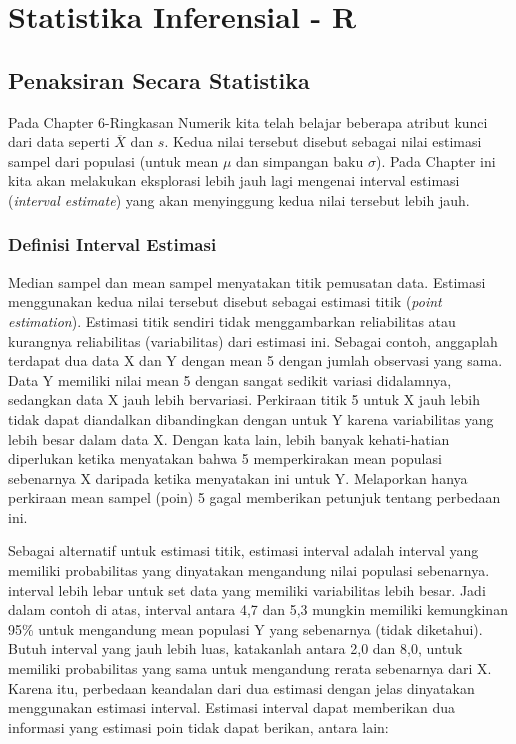 \documentclass[]{book}
\begin{document}
\part*{Statistika Inferensial -
R}\label{part-statistika-inferensial---r}

\chapter{Penaksiran Secara
Statistika}\label{penaksiran-secara-statistika}

Pada Chapter 6-Ringkasan Numerik kita telah belajar beberapa atribut
kunci dari data seperti \(\overline{X}\) dan \(s\). Kedua nilai tersebut
disebut sebagai nilai estimasi sampel dari populasi (untuk mean \(\mu\)
dan simpangan baku \(\sigma\)). Pada Chapter ini kita akan melakukan
eksplorasi lebih jauh lagi mengenai interval estimasi (\emph{interval
estimate}) yang akan menyinggung kedua nilai tersebut lebih jauh.

\section{Definisi Interval Estimasi}\label{definisi-interval-estimasi}

Median sampel dan mean sampel menyatakan titik pemusatan data. Estimasi
menggunakan kedua nilai tersebut disebut sebagai estimasi titik
(\emph{point estimation}). Estimasi titik sendiri tidak menggambarkan
reliabilitas atau kurangnya reliabilitas (variabilitas) dari estimasi
ini. Sebagai contoh, anggaplah terdapat dua data X dan Y dengan mean 5
dengan jumlah observasi yang sama. Data Y memiliki nilai mean 5 dengan
sangat sedikit variasi didalamnya, sedangkan data X jauh lebih
bervariasi. Perkiraan titik 5 untuk X jauh lebih tidak dapat diandalkan
dibandingkan dengan untuk Y karena variabilitas yang lebih besar dalam
data X. Dengan kata lain, lebih banyak kehati-hatian diperlukan ketika
menyatakan bahwa 5 memperkirakan mean populasi sebenarnya X daripada
ketika menyatakan ini untuk Y. Melaporkan hanya perkiraan mean sampel
(poin) 5 gagal memberikan petunjuk tentang perbedaan ini.

Sebagai alternatif untuk estimasi titik, estimasi interval adalah
interval yang memiliki probabilitas yang dinyatakan mengandung nilai
populasi sebenarnya. interval lebih lebar untuk set data yang memiliki
variabilitas lebih besar. Jadi dalam contoh di atas, interval antara 4,7
dan 5,3 mungkin memiliki kemungkinan 95\% untuk mengandung mean populasi
Y yang sebenarnya (tidak diketahui). Butuh interval yang jauh lebih
luas, katakanlah antara 2,0 dan 8,0, untuk memiliki probabilitas yang
sama untuk mengandung rerata sebenarnya dari X. Karena itu, perbedaan
keandalan dari dua estimasi dengan jelas dinyatakan menggunakan estimasi
interval. Estimasi interval dapat memberikan dua informasi yang estimasi
poin tidak dapat berikan, antara lain:
\end{document}
